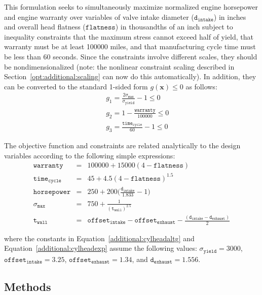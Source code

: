 This formulation seeks to simultaneously maximize normalized engine
horsepower and engine warranty over variables of valve intake diameter
($\mathtt{d_{intake}}$) in inches and overall head flatness
($\mathtt{flatness}$) in thousandths of an inch subject to inequality
constraints that the maximum stress cannot exceed half of yield, that
warranty must be at least 100000 miles, and that manufacturing cycle
time must be less than 60 seconds. Since the constraints involve
different scales, they should be nondimensionalized (note: the
nonlinear constraint scaling described in
Section~\ref{opt:additional:scaling} can now do this
automatically). In addition, they can be converted to the standard
1-sided form $g(\mathbf{x}) \leq 0$ as follows:
\begin{eqnarray}
  & & g_1=\frac{2\sigma_{\mathtt{max}}}{\sigma_{\mathtt{yield}}}-1 \leq 0
  \nonumber\\
  & & g_2=1-\frac{\mathtt{warranty}}{100000} \leq 0
  \label{additional:cylheadaltg}\\
  & & g_3=\frac{\mathtt{time_{cycle}}}{60}-1 \leq 0\nonumber
\end{eqnarray}

The objective function and constraints are related analytically to the
design variables according to the following simple expressions:
\begin{eqnarray}
\mathtt{warranty}     &=& 100000+15000(4-\mathtt{flatness})\nonumber\\
\mathtt{time_{cycle}} &=& 45+4.5(4-\mathtt{flatness})^{1.5}\nonumber\\
\mathtt{horsepower}   &=& 250+200\bigg(\frac{\mathtt{d_{intake}}}{1.833}-1\bigg)
  \label{additional:cylheadexp}\\
\sigma_{\mathtt{max}} &=& 750+\frac{1}{(\mathtt{t_{wall}})^{2.5}}\nonumber\\
\mathtt{t_{wall}}     &=& \mathtt{offset_{intake}-offset_{exhaust}}-
  \frac{(\mathtt{d_{intake}-d_{exhaust}})}{2}\nonumber
\end{eqnarray}

where the constants in Equation~\ref{additional:cylheadaltg} and
Equation~\ref{additional:cylheadexp} assume the following values:
$\sigma_{\mathtt{yield}}=3000$, $\mathtt{offset_{intake}}=3.25$,
$\mathtt{offset_{exhaust}}=1.34$, and $\mathtt{d_{exhaust}}=1.556$.

\subsection{Methods}\label{additional:cylinder:methods}

